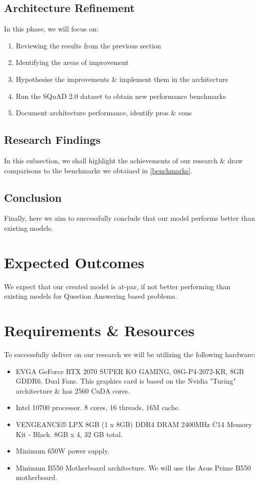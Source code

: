 \documentclass[11pt]{article}
\begin{document}
\subsection{Architecture Refinement}\label{refinement}
In this phase, we will focus on:
\begin{enumerate}
    \item{Reviewing the results from the previous section}
    \item{Identifying the areas of improvement}
    \item{Hypothesise the improvements \& implement them in the architecture}
    \item{Run the SQuAD 2.0 dataset\cite{dataset} to obtain new performance benchmarks}
    \item{Document architecture performance, identify pros \& cons}
\end{enumerate}
\subsection{Research Findings}\label{findings}
In this subsection, we shall highlight the achievements of our research \& draw comparisons to the benchmarks we obtained in \ref{benchmarks}.
\subsection{Conclusion}\label{conclusions}

Finally, here we aim to successfully conclude that our model performs better than existing models.
\section{Expected Outcomes}\label{expectedoutcomes}

We expect that our created model is at-par, if not better performing than existing models for Question Answering based problems.
\section{Requirements \& Resources}\label{resources}

To successfully deliver on our research we will be utilizing the following hardware:
\begin{itemize}
    \item EVGA GeForce RTX 2070 SUPER KO GAMING, 08G-P4-2072-KR, 8GB GDDR6, Dual Fans\cite{2070}. This graphics card is based on the Nvidia "Turing" architecture \& has 2560 CuDA cores.
    \item Intel 10700 processor. 8 cores, 16 threads, 16M cache\cite{intel}.
    \item VENGEANCE® LPX 8GB (1 x 8GB) DDR4 DRAM 2400MHz C14 Memory Kit - Black\cite{ram}. 8GB x 4, 32 GB total.
    \item Minimum 650W power supply.
    \item Minimum B550 Motherboard architecture. We will use the Asus Prime B550 motherboard\cite{asus}.
\end{itemize}
\end{document}
